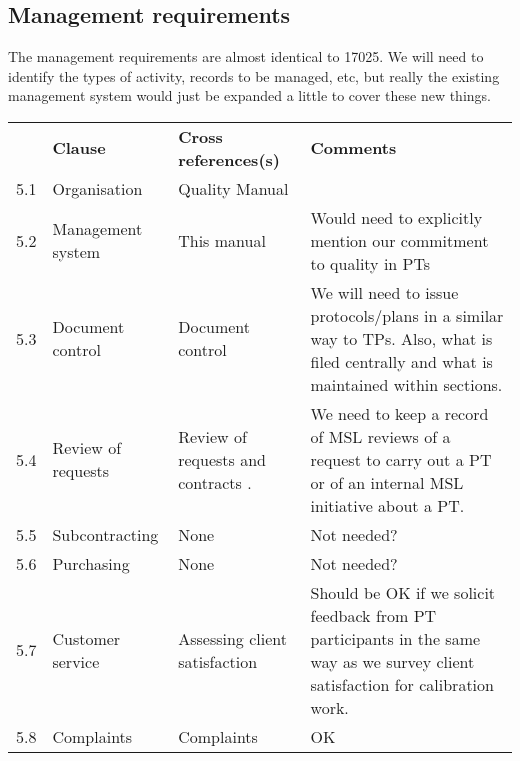 \newpage
\subsection{Management requirements}
The management requirements are almost identical to 17025. We will need to identify the types of activity, records to be managed, etc, but really the existing management system would just be expanded a little to cover these new things.

\begin{center}
{\renewcommand*{\arraystretch}{1.4}
\begin{longtable}{p{1em}p{10em}p{12em}p{16em}}
	\rowcolor[rgb]{ 0,  0,  0} 
	\textcolor[rgb]{ 1,  1,  1}{} & 
	\textcolor[rgb]{ 1,  1,  1}{\textbf{Clause}} & 
	\textcolor[rgb]{ 1,  1,  1}{\textbf{Cross references(s)}} &
	\textcolor[rgb]{ 1,  1,  1}{\textbf{Comments}} \\
5.1	& Organisation	& Quality Manual  \cite[\S\ref*{QM-s:organisation}]{MSL_Quality_Manual}  \\
5.2	&Management system	& This manual	&Would need to explicitly mention our commitment to quality in PTs \\
5.3	& Document control	& Document control\cite[\S\ref*{QM-s:documents_and_document_control}]{MSL_Quality_Manual} & We will need to issue protocols/plans in a similar way to TPs. Also, what is filed centrally and what is maintained within sections.\\
5.4	& Review of requests	& Review of requests and contracts \cite[\S\ref*{QM-s:requests_and_tenders}]{MSL_Quality_Manual} . 
& We need to keep a record of MSL reviews of a request to carry out a PT or of an internal MSL initiative about a PT.\\
5.5	& Subcontracting	& None	& Not needed? \\
5.6	& Purchasing	& None	& Not needed? \\
5.7	& Customer service	& Assessing client satisfaction \cite[\S\ref*{QM-ss:client_satisfaction}]{MSL_Quality_Manual} & Should be OK if we solicit feedback from PT participants in the same way as we survey client satisfaction for calibration work. \\
5.8	& Complaints	& Complaints \cite[\S\ref*{QM-ss:complaints}]{MSL_Quality_Manual} & OK\\


\end{longtable}}
\end{center}
